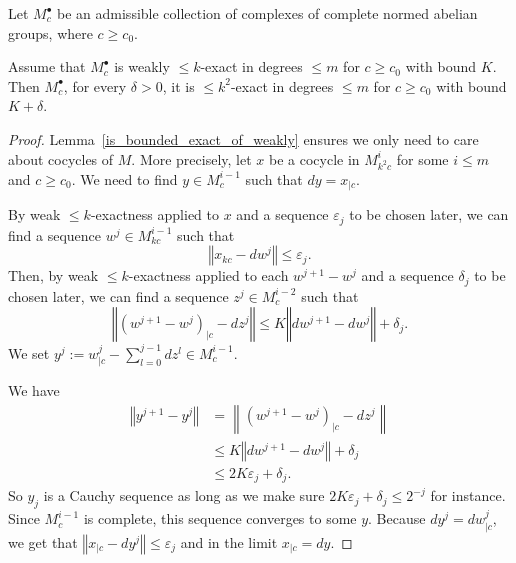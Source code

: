 \begin{lemma}
  \label{weakexact_implies_exact}
  Let $M^\bullet_c$ be an admissible collection
  of complexes of complete normed abelian groups, where $c\geq c_0$.

  Assume that $M^\bullet_c$ is weakly $\leq k$-exact in degrees $\leq m$ for $c\geq c_0$ with bound $K$.
  Then $M^\bullet_c$, for every $δ > 0$, it is $\leq k^2$-exact in degrees $\leq m$ for $c\geq c_0$
  with bound $K+δ$.
\end{lemma}
\begin{proof}
  Lemma~\ref{is_bounded_exact_of_weakly} ensures we only need to care about cocycles
  of $M$. More precisely, let $x$ be a cocycle in $M^i_{k^2c}$ for some $i ≤ m$ and $c ≥ c_0$.
  We need to find $y \in M^{i-1}_c$ such that $dy = x_{|c}$.

  By weak $\leq k$-exactness applied to $x$ and a sequence $ε_j$ to be chosen later, we can find
  a sequence $w^j \in M^{i-1}_{kc}$ such that
  \[
    ‖x_{kc} - dw^j‖ ≤ ε_j.
  \]
  Then, by weak $\leq k$-exactness applied to each $w^{j + 1} - w^j$ and a sequence $δ_j$ to be chosen later, we can find
  a sequence $z^j \in M^{i-2}_{c}$ such that
  \[
    ‖(w^{j+1} - w^j)_{|c} - dz^j‖ ≤ K‖dw^{j+1} - dw^j‖ + δ_j.
  \]
  We set $y^j := w^j_{|c} - \sum_{l=0}^{j-1} dz^l ∈ M^{i-1}_c$.


  We have
  \begin{align*}
    ‖y^{j + 1} - y^j‖ &=  \left\|(w^{j + 1} - w^j)_{|c} - dz^j\right\| \\
                      &≤  K‖dw^{j+1} - dw^j‖ + δ_j \\
                      &≤  2Kε_j + δ_j.
  \end{align*}
  So $y_j$ is a Cauchy sequence as long as we make sure $2Kε_j + δ_j ≤ 2^{-j}$ for instance.
  Since $M^{i-1}_c$ is complete, this sequence converges to some $y$.
  Because $dy^j = dw^j_{|c}$, we get that $‖x_{|c} - dy^j‖ ≤ ε_j$ and in the limit $x_{|c} = dy$.
\end{proof}

